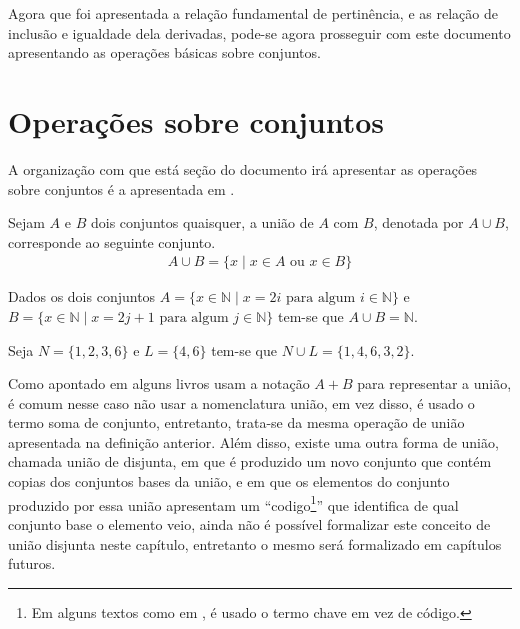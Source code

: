 Agora que foi apresentada a relação fundamental de pertinência, e as relação de inclusão e igualdade dela derivadas, pode-se agora prosseguir com este documento apresentando as operações básicas sobre conjuntos.

\section{Operações sobre conjuntos}\label{sec:OperacaoSobreConjuntos}

A organização com que está seção do documento irá apresentar as operações sobre conjuntos é a apresentada em \cite{lipschutz2013-MD}.

\begin{definicao}\label{def:UniaoConjuntos}
  Sejam $A$ e $B$ dois conjuntos quaisquer, a união de $A$ com $B$, denotada por $A \cup B$, corresponde ao seguinte conjunto.
  \begin{eqnarray*}
    A \cup B = \{x \mid x \in A \mbox{ ou } x \in B\}
  \end{eqnarray*}
\end{definicao}

\begin{exemplo}\label{exe:UniaoConjuntos1}
  Dados os dois conjuntos $A = \{x \in \mathbb{N} \mid x = 2i \mbox{ para algum } i \in \mathbb{N}\}$ e $B = \{x \in \mathbb{N} \mid x = 2j + 1 \mbox{ para algum } j \in \mathbb{N}\}$ tem-se que $A \cup B = \mathbb{N}$.
\end{exemplo}

\begin{exemplo}\label{exe:UniaoConjuntos2}
  Seja $N = \{1, 2, 3, 6\}$ e $L = \{4, 6\}$ tem-se que $N \cup L = \{1, 4, 6, 3, 2\}$.
\end{exemplo}

Como apontado em \cite{lipschutz1978-TC} alguns livros usam a notação $A + B$ para representar a união, é comum nesse caso não usar a nomenclatura união, em vez disso, é usado o termo soma de conjunto, entretanto, trata-se da mesma operação de união apresentada na definição anterior. Além disso, existe uma outra forma de união, chamada união de disjunta, em que é produzido um novo conjunto que contém copias dos conjuntos bases da união, e em que os elementos do conjunto produzido por essa união apresentam um ``codigo\footnote{Em alguns textos como em \cite{carmo2013}, é usado o termo chave em vez de código.}'' que identifica de qual conjunto base o elemento veio, ainda não é possível formalizar este conceito de união disjunta neste capítulo, entretanto o mesmo será formalizado em capítulos futuros.

